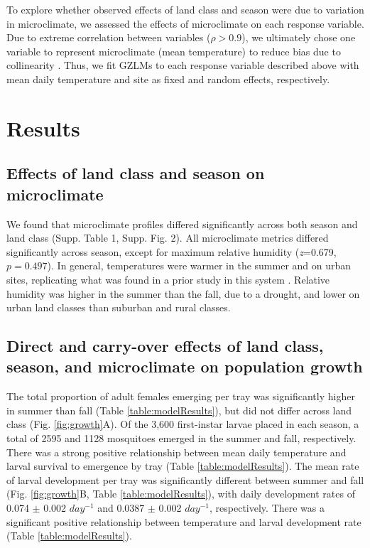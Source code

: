 \documentclass[12pt]{article}
\begin{document}
To explore whether observed effects of land class and season were due to variation in microclimate, we assessed the effects of microclimate on each response variable. Due to extreme correlation between variables ($\rho>0.9$), we ultimately chose one variable to represent microclimate (mean temperature) to reduce bias due to collinearity \citep{graham2003}. Thus, we fit GZLMs to each response variable described above with mean daily temperature and site as fixed and random effects, respectively.

\section{Results}

\subsection{Effects of land class and season on microclimate}

We found that microclimate profiles differed significantly across both season and land class (Supp. Table 1, Supp. Fig. 2). All microclimate metrics differed significantly across season, except for maximum relative humidity (\textit{z}=0.679, $p=0.497$). In general, temperatures were warmer in the summer and on urban sites, replicating what was found in a prior study in this system \citep{murdock2017}. Relative humidity was higher in the summer than the fall, due to a drought, and lower on urban land classes than suburban and rural classes.

\subsection{Direct and carry-over effects of land class, season, and microclimate on population growth}

The total proportion of adult females emerging per tray was significantly higher in summer than fall (Table \ref{table:modelResults}), but did not differ across land class (Fig. \ref{fig:growth}A). Of the 3,600 first-instar larvae placed in each season, a total of 2595 and 1128 mosquitoes emerged in the summer and fall, respectively. There was a strong positive relationship between mean daily temperature and larval survival to emergence by tray (Table \ref{table:modelResults}). The mean rate of larval development per tray was significantly different between summer and fall (Fig. \ref{fig:growth}B, Table \ref{table:modelResults}), with daily development rates of 0.074 $\pm$ 0.002 $day^{-1}$ and 0.0387 $\pm$ 0.002 $day^{-1}$, respectively. There was a significant positive relationship between temperature and larval development rate (Table \ref{table:modelResults}).
\end{document}
